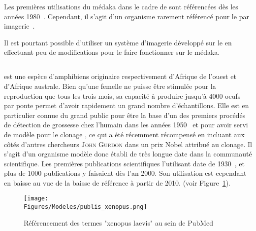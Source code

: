\documentclass[\main/main.tex]{subfiles}
\begin{document}
Les premières utilisations du médaka dans le cadre de \hcs{} sont référencées dès les années 1980~\cite{cameron_1985,Hatanaka_1982}.
%
Cependant, il s'agit d'un organisme rarement référencé pour le \hcs{} par imagerie~\cite{gierten_2020,genest_2019}.

%
Il est pourtant possible d'utiliser un système d'imagerie développé sur le \pz{}
en effectuant peu de modifications pour le faire fonctionner sur le médaka.

    \subsection{\xl}

%
\xl{} est une espèce d'amphibiens originaire respectivement d'Afrique de l'ouest et d'Afrique australe.
%
Bien qu'une femelle ne puisse être stimulée pour la reproduction que tous les trois mois,
sa capacité à produire jusqu'à 4000 oeufs par ponte permet d'avoir rapidement un grand nombre d'échantillons.
%
Elle est en particulier connue du grand public pour être la base d'un des premiers procédés de détection de grossesse chez l'humain dans les années 1950~\cite{hobson_1958,Dittebrandt_1949,polack_1949}
et pour avoir servi de modèle pour le clonage , ce qui a été récemment récompensé en incluant aux côtés d'autres chercheurs \textsc{John Gurdon}  dans un prix Nobel attribué au clonage.
%
Il s'agit d'un organisme modèle donc établi de très longue date dans la communauté scientifique.
%
Les premières publications scientifiques l'utilisant date de 1930~\cite{edgeworth_1930},
et plus de 1000 publications y faisaient dès l'an 2000.
%
Son utilisation est cependant en baisse au vue de la baisse de référence à partir de 2010. (voir Figure~\ref{fig:model:xl:stats}).
%

\begin{figure}[htbp]{\textwidth} 
    \centering
       \centering \texttt{[image: \\Figures/Modeles/publis\_xenopus.png]}
       \caption{
            \label{fig:model:xl:stats}Référencement des termes "xenopus laevis" au sein de PubMed
            }
\end{figure}
\end{document}
